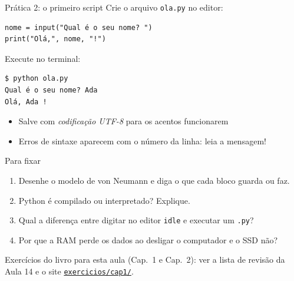 \documentclass[aspectratio=169,10pt,t]{beamer}
\begin{document}
\begin{frame}[fragile]{Prática 2: o primeiro script}
  Crie o arquivo \texttt{ola.py} no editor:
\begin{lstlisting}
nome = input("Qual é o seu nome? ")
print("Olá,", nome, "!")
\end{lstlisting}
  Execute no terminal:
\begin{lstlisting}[language={},style=saida]
$ python ola.py
Qual é o seu nome? Ada
Olá, Ada !
\end{lstlisting}
  \begin{itemize}
    \item Salve com \emph{codificação UTF-8} para os acentos funcionarem
    \item Erros de sintaxe aparecem com o número da linha: leia a mensagem!
  \end{itemize}
\end{frame}

\begin{frame}{Para fixar}
  \begin{enumerate}
    \item Desenhe o modelo de von Neumann e diga o que cada bloco guarda ou faz.
    \item Python é compilado ou interpretado? Explique.
    \item Qual a diferença entre digitar no editor \texttt{idle} e executar um \texttt{.py}?
    \item Por que a RAM perde os dados ao desligar o computador e o SSD não?
  \end{enumerate}
  \vspace{1ex}
  Exercícios do livro para esta aula (Cap.~1 e Cap.~2): ver a lista de revisão da Aula 14 e o site
  \href{\siteurl exercicios/cap1/}{\texttt{\siteurl exercicios/cap1/}}.
\end{frame}

\end{document}
